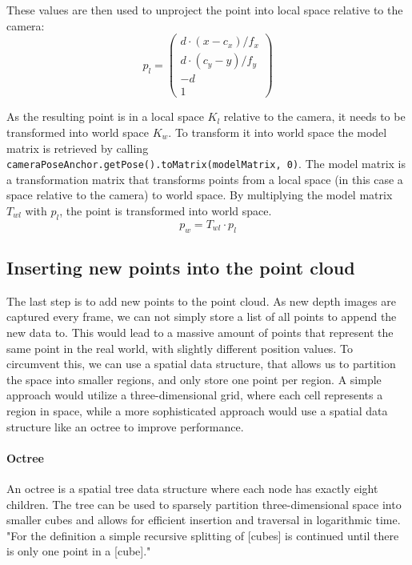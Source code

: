 These values are then used to unproject the point into local space relative to the camera:
\begin{equation}
    p_l = \begin{pmatrix}
              d \cdot (x - c_x) / f_x \\
              d \cdot (c_y - y) / f_y \\
              -d                      \\
              1
    \end{pmatrix}
\end{equation}

As the resulting point is in a local space $K_l$ relative to the camera, it needs to be transformed into world space $K_w$.
To transform it into world space the model matrix is retrieved by calling
\texttt{cameraPoseAnchor.getPose().toMatrix(modelMatrix, 0)}.
The model matrix is a transformation matrix that transforms points from a local space (in this case a space relative to the camera)
to world space.
By multiplying the model matrix $T_{wl}$ with $p_l$, the point is transformed into world space.
\begin{equation}
    p_w = T_{wl} \cdot p_l
\end{equation}

\cite{google_llc_codelab_raw_depth, google_llc_arcore_doc}

\subsection{Inserting new points into the point cloud}

The last step is to add new points to the point cloud.
As new depth images are captured every frame, we can not simply store a list of all points to append the new data to.
This would lead to a massive amount of points that represent the same point in the real world, with slightly different position values.
To circumvent this, we can use a spatial data structure, that allows us to partition the space into smaller regions, and only store one point per region.
A simple approach would utilize a three-dimensional grid, where each cell represents a region in space,
while a more sophisticated approach would use a spatial data structure like an octree to improve performance.

\paragraph{Octree}
An octree is a spatial tree data structure where each node has exactly eight children.
The tree can be used to sparsely partition three-dimensional space into smaller cubes and allows for efficient
insertion and traversal in logarithmic time.
"For the definition a simple recursive splitting of [cubes] is continued until there is only one point in a [cube]."
\parencite{gabriel_zachmann_geometric_2002}

